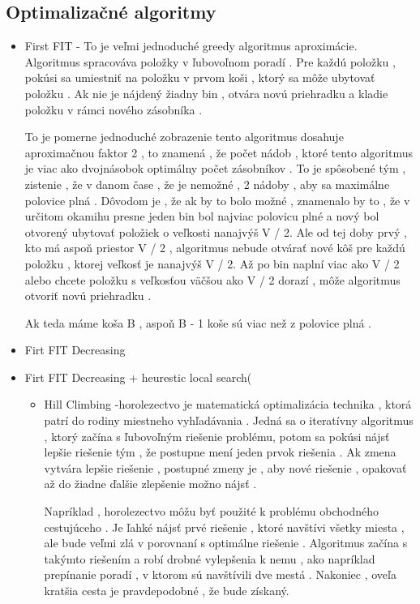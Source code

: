 \subsection{Optimalizačné algoritmy}
\begin{itemize}
\item First FIT - To je veľmi jednoduché greedy algoritmus aproximácie. Algoritmus spracováva položky v ľubovoľnom poradí . Pre každú položku , pokúsi sa umiestniť na položku v prvom koši , ktorý sa môže ubytovať položku . Ak nie je nájdený žiadny bin , otvára novú priehradku a kladie položku v rámci nového zásobníka .

To je pomerne jednoduché zobrazenie tento algoritmus dosahuje aproximačnou faktor 2 , to znamená , že počet nádob , ktoré tento algoritmus je viac ako dvojnásobok optimálny počet zásobníkov . To je spôsobené tým , zistenie , že v danom čase , že je nemožné , 2 nádoby , aby sa maximálne polovice plná . Dôvodom je , že ak by to bolo možné , znamenalo by to , že v určitom okamihu presne jeden bin bol najviac polovicu plné a nový bol otvorený ubytovať položiek o veľkosti nanajvýš V / 2. Ale od tej doby prvý , kto má aspoň priestor V / 2 , algoritmus nebude otvárať nové kôš pre každú položku , ktorej veľkosť je nanajvýš V / 2. Až po bin naplní viac ako V / 2 alebo chcete položku s veľkosťou väčšou ako V / 2 dorazí , môže algoritmus otvoriť novú priehradku .

Ak teda máme koša B , aspoň B - 1 koše sú viac než z polovice plná .
\item Firt FIT Decreasing
\item Firt FIT Decreasing + heurestic local search(

\begin{itemize}
\item Hill Climbing -horolezectvo je matematická optimalizácia technika , ktorá patrí do rodiny miestneho vyhľadávania . Jedná sa o iteratívny algoritmus , ktorý začína s ľubovoľným riešenie problému, potom sa pokúsi nájsť lepšie riešenie tým , že postupne mení jeden prvok riešenia . Ak zmena vytvára lepšie riešenie , postupné zmeny je , aby nové riešenie , opakovať až do žiadne ďalšie zlepšenie možno nájsť .

Napríklad , horolezectvo môžu byť použité k problému obchodného cestujúceho . Je ľahké nájsť prvé riešenie , ktoré navštívi všetky miesta , ale bude veľmi zlá v porovnaní s optimálne riešenie . Algoritmus začína s takýmto riešením a robí drobné vylepšenia k nemu , ako napríklad prepínanie poradí , v ktorom sú navštívili dve mestá . Nakoniec , oveľa kratšia cesta je pravdepodobné , že bude získaný.


\end{itemize}
\end{itemize}
